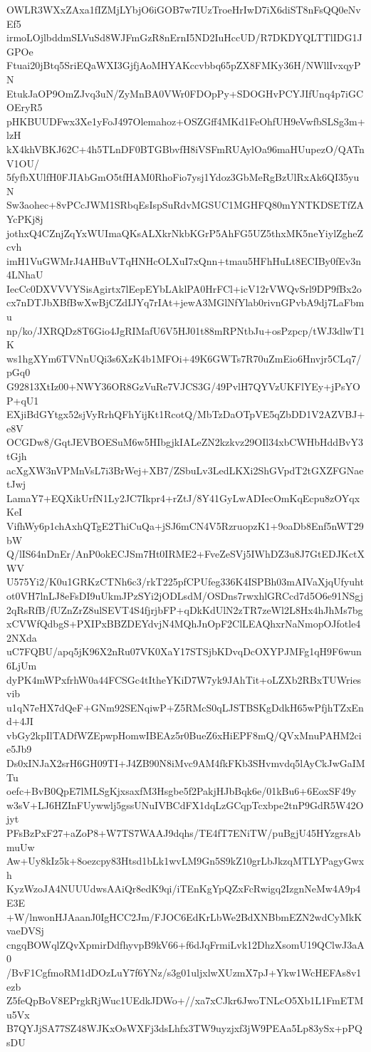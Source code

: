 OWLR3WXxZAxa1fIZMjLYbjO6iGOB7w7IUzTroeHrIwD7iX6diST8nFsQQ0eNvEf5
irmoLOjlbddmSLVuSd8WJFmGzR8nErnI5ND2IuHccUD/R7DKDYQLTTlIDG1JGPOe
Ftuai20jBtq5SriEQaWXI3GjfjAoMHYAKccvbbq65pZX8FMKy36H/NWllIvxqyPN
EtukJaOP9OmZJvq3uN/ZyMnBA0VWr0FDOpPy+SDOGHvPCYJIfUnq4p7iGCOEryR5
pHKBUUDFwx3Xe1yFoJ497Olemahoz+OSZGff4MKd1FeOhfUH9eVwfbSLSg3m+lzH
kX4khVBKJ62C+4h5TLnDF0BTGBbvfH8iVSFmRUAylOa96maHUupezO/QATnV1OU/
5fyfbXUlfH0FJIAbGmO5tfHAM0RhoFio7ysj1Ydoz3GbMeRgBzUlRxAk6QI35yuN
Sw3aohec+8vPCcJWM1SRbqEsIspSuRdvMGSUC1MGHFQ80mYNTKDSETfZAYcPKj8j
jothxQ4CZnjZqYxWUImaQKsALXkrNkbKGrP5AhFG5UZ5thxMK5neYiylZgheZcvh
imH1VuGWMrJ4AHBuVTqHNHcOLXuI7xQnn+tmau5HFhHuLt8ECIBy0fEv3n4LNhaU
IecCc0DXVVVYSisAgirtx7lEepEYbLAklPA0HrFCl+icV12rVWQvSrl9DP9fBx2o
cx7nDTJbXBfBwXwBjCZdIJYq7rIAt+jewA3MGlNfYlab0rivnGPvbA9dj7LaFbmu
np/ko/JXRQDz8T6Gio4JgRIMafU6V5HJ01t88mRPNtbJu+osPzpcp/tWJ3dlwT1K
ws1hgXYm6TVNnUQi3s6XzK4b1MFOi+49K6GWTs7R70uZmEio6Hnvjr5CLq7/pGq0
G92813XtIz00+NWY36OR8GzVuRe7VJCS3G/49PvlH7QYVzUKFlYEy+jPsYOP+qU1
EXjiBdGYtgx52sjVyRrhQFhYijKt1RcotQ/MbTzDaOTpVE5qZbDD1V2AZVBJ+e8V
OCGDw8/GqtJEVBOESuM6w5HIbgjkIALeZN2kzkvz29OIl34xbCWHbHddBvY3tGjh
acXgXW3nVPMnVsL7i3BrWej+XB7/ZSbuLv3LedLKXi2ShGVpdT2tGXZFGNaetJwj
LamaY7+EQXikUrfN1Ly2JC7Ikpr4+rZtJ/8Y41GyLwADIecOmKqEcpu8zOYqxKeI
VifhWy6p1chAxhQTgE2ThiCuQa+jSJ6mCN4V5RzruopzK1+9oaDb8Enf5nWT29bW
Q/lIS64nDnEr/AnP0okECJSm7Ht0IRME2+FveZeSVj5IWhDZ3u8J7GtEDJKctXWV
U575Yi2/K0u1GRKzCTNh6c3/rkT225pfCPUfeg336K4ISPBh03mAIVaXjqUfyuht
ot0VH7lnLJ8eFsDI9uUkmJPzSYi2jODLsdM/OSDns7rwxhlGRCcd7d5O6e91NSgj
2qRsRfB/fUZnZrZ8ulSEVT4S4fjrjbFP+qDkKdUlN2zTR7zeWl2L8Hx4hJhMs7bg
xCVWfQdbgS+PXIPxBBZDEYdvjN4MQhJnOpF2ClLEAQhxrNaNmopOJfotle42NXda
uC7FQBU/apq5jK96X2nRu07VK0XaY17STSjbKDvqDcOXYPJMFg1qH9F6wun6LjUm
dyPK4mWPxfrhW0a44FCSGc4tItheYKiD7W7yk9JAhTit+oLZXb2RBxTUWriesvib
u1qN7eHX7dQeF+GNm92SENqiwP+Z5RMcS0qLJSTBSKgDdkH65wPfjhTZxEnd+4JI
vbGy2kpIlTADfWZEpwpHomwIBEAz5r0BueZ6xHiEPF8mQ/QVxMnuPAHM2cie5Jb9
Ds0xINJaX2srH6GH09TI+J4ZB90N8iMvc9AM4fkFKb3SHvmvdq5lAyCkJwGaIMTu
oefc+BvB0QpE7lMLSgKjxsaxfM3Hsgbe5f2PakjHJbBqk6e/01kBu6+6EoxSF49y
w3sV+LJ6HZInFUywwlj5gssUNuIVBCdFX1dqLzGCqpTcxbpe2tnP9GdR5W42Ojyt
PFsBzPxF27+aZoP8+W7TS7WAAJ9dqhs/TE4fT7ENiTW/puBgjU45HYzgrsAbmuUw
Aw+Uy8kIz5k+8oezcpy83Htsd1bLk1wvLM9Gn5S9kZ10grLbJkzqMTLYPagyGwxh
KyzWzoJA4NUUUdwsAAiQr8edK9qi/iTEnKgYpQZxFcRwigq2IzgnNeMw4A9p4E3E
+W/lnwonHJAaanJ0IgHCC2Jm/FJOC6EdKrLbWe2BdXNBbmEZN2wdCyMkKvaeDVSj
cngqBOWqlZQvXpmirDdfhyvpB9kV66+f6dJqFrmiLvk12DhzXsomU19QClwJ3aA0
/BvF1CgfmoRM1dDOzLuY7f6YNz/s3g01uljxlwXUzmX7pJ+Ykw1WcHEFAs8v1ezb
Z5feQpBoV8EPrgkRjWuc1UEdkJDWo+//xa7xCJkr6JwoTNLcO5Xb1L1FmETMu5Vx
B7QYJjSA77SZ48WJKxOsWXFj3dsLhfx3TW9uyzjxf3jW9PEAa5Lp83ySx+pPQsDU
